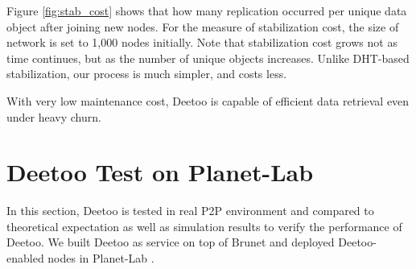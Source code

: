 \documentclass[9.5pt,journal,final,finalsubmission,twocolumn]{IEEEtran}
\begin{document}
Figure \ref{fig:stab_cost} shows that how many replication occurred per unique
data object after joining new nodes. 
For the measure of stabilization cost, 
the size of network is set to 1,000 nodes initially. 
Note that stabilization cost grows not as time continues, but as the number of unique 
objects increases.
Unlike DHT-based stabilization, our process is much simpler, and costs less.

With very low maintenance cost, Deetoo is capable of efficient data retrieval 
even under heavy churn.

\section{Deetoo Test on Planet-Lab}\label{sec:test}
In this section, Deetoo is tested in real P2P environment 
and compared to theoretical expectation 
as well as simulation results to verify the performance of Deetoo.
We built Deetoo as service on top of Brunet \cite{brunet} and deployed
Deetoo-enabled nodes in Planet-Lab \cite{planetlab}. 

\end{document}
